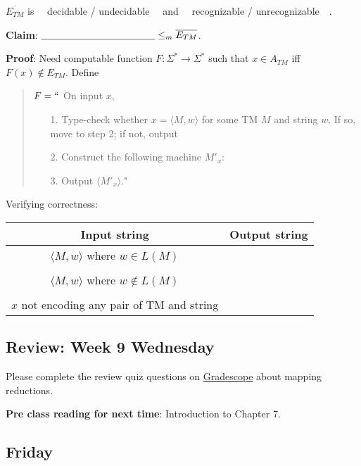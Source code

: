 \documentclass[12pt, oneside]{article}
\begin{document}
$\overline{E_{TM}}$ is ~~decidable /  undecidable~~ and ~~recognizable /  unrecognizable~~.


{\bf Claim}: $\underline{\phantom{\hspace{1.6in}}}  \leq_m \overline{E_{TM}}$.

{\bf Proof}: Need computable function  $F: \Sigma^* \to \Sigma^*$  such that  $x \in A_{TM}$ iff $F(x)  \notin  E_{TM}$.
Define
\begin{quote}
$F =  ``$ On input $x$,
\begin{itemize}
\item[1.] Type-check whether  $x = \langle M, w \rangle$ for some TM $M$ and string $w$.   If so, move to step 2; if  not, output 
\item[2.] Construct the following machine $M'_x$:
\vspace{50pt}
\item[3.] Output $\langle M'_x \rangle$."
\end{itemize}
\end{quote}

Verifying correctness:
\begin{center}
\begin{tabular}{|c|c|}
\hline
Input string &  Output string \\
\hline
$\langle M, w \rangle$ where  $w \in L(M)$ & \phantom{\hspace{4in}} \\
& \\
$\langle M, w \rangle$ where $w \notin L(M)$ & \\
&\\
$x$ not encoding any pair of  TM and string   &  \\
\hline
\end{tabular}
\end{center}

\newpage 
\subsection*{Review: Week 9 Wednesday}

Please complete the review quiz questions on \href{http://gradescope.com}{Gradescope} about 
mapping reductions.

{\bf Pre class reading for next time}: Introduction to Chapter 7.



\newpage
\subsection*{Friday}
\end{document}
